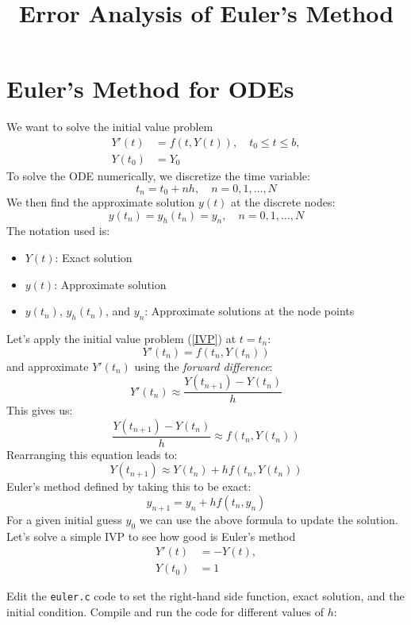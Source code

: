 \documentclass[11pt]{article}
\title{Error Analysis of Euler's Method}
\begin{document}
\author{}
\maketitle

\section{Euler's Method for ODEs}
We want to solve the initial value problem
\begin{equation}\label{IVP}
    \begin{aligned}
        Y'(t) &= f(t, Y(t)), \quad t_0 \leq t \leq b, \\
        Y(t_0) &= Y_0
    \end{aligned}
\end{equation}
To solve the ODE numerically, we discretize the time variable:
\[
    t_n = t_0 + n h, \quad n = 0, 1, \dots, N
\]
We then find the approximate solution \( y(t) \) at the discrete nodes:
\[
    y(t_n) = y_h(t_n) = y_n, \quad n = 0, 1, \dots, N
\]
The notation used is:
\begin{itemize}
    \item \( Y(t) \): Exact solution
    \item \( y(t) \): Approximate solution
    \item \( y(t_n) \), \( y_h(t_n) \), and \( y_n \): Approximate solutions at the node points
\end{itemize}
Let's apply the initial value problem (\ref{IVP}) at \( t = t_n \):
\[
    Y'(t_n) = f(t_n, Y(t_n))
\]
and approximate \( Y'(t_n) \) using the \emph{forward difference}:
\[
    Y'(t_n) \approx \frac{Y(t_{n+1}) - Y(t_n)}{h}
\]
This gives us:
\[
    \frac{Y(t_{n+1}) - Y(t_n)}{h} \approx f(t_n, Y(t_n))
\]
Rearranging this equation leads to:
\[
    Y(t_{n+1}) \approx Y(t_n) + hf(t_n, Y(t_n))
\]
Euler's method defined by taking this to be exact:
\begin{equation}
    y_{n+1} = y_n + hf(t_n, y_n)
\end{equation}
For a given initial guess $y_0$ we can use the above formula to update the solution.
Let's solve a simple IVP to see how good is Euler's method
\begin{equation}
    \begin{aligned}
        Y'(t) &= -Y(t), \\
        Y(t_0) &= 1
    \end{aligned}
\end{equation}

Edit the \texttt{euler.c} code to set the right-hand side function, exact solution, and the initial condition. Compile and run the code for different values of $h$:
\end{document}
